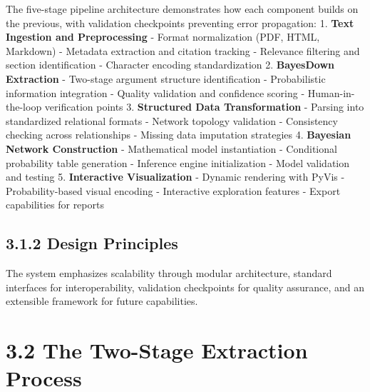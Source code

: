 \documentclass[
  11pt,
  letterpaper,
]{book}
\begin{document}
The five-stage pipeline architecture demonstrates how each component
builds on the previous, with validation checkpoints preventing error
propagation: 1. \textbf{Text Ingestion and Preprocessing} - Format
normalization (PDF, HTML, Markdown) - Metadata extraction and citation
tracking - Relevance filtering and section identification - Character
encoding standardization 2. \textbf{BayesDown Extraction} - Two-stage
argument structure identification - Probabilistic information
integration - Quality validation and confidence scoring -
Human-in-the-loop verification points 3. \textbf{Structured Data
Transformation} - Parsing into standardized relational formats - Network
topology validation - Consistency checking across relationships -
Missing data imputation strategies 4. \textbf{Bayesian Network
Construction} - Mathematical model instantiation - Conditional
probability table generation - Inference engine initialization - Model
validation and testing 5. \textbf{Interactive Visualization} - Dynamic
rendering with PyVis - Probability-based visual encoding - Interactive
exploration features - Export capabilities for reports

\subsection*{3.1.2 Design Principles}\label{sec-design-principles}

\begin{tcolorbox}[enhanced jigsaw, toprule=.15mm, colbacktitle=quarto-callout-tip-color!10!white, opacitybacktitle=0.6, leftrule=.75mm, coltitle=black, rightrule=.15mm, opacityback=0, bottomtitle=1mm, title=\textcolor{quarto-callout-tip-color}{\faLightbulb}\hspace{0.5em}{Core Design Philosophy}, toptitle=1mm, breakable, titlerule=0mm, left=2mm, arc=.35mm, colframe=quarto-callout-tip-color-frame, bottomrule=.15mm, colback=white]

The system emphasizes scalability through modular architecture, standard
interfaces for interoperability, validation checkpoints for quality
assurance, and an extensible framework for future capabilities.

\end{tcolorbox}

\section*{3.2 The Two-Stage Extraction
Process}\label{sec-two-stage-extraction}
\end{document}
